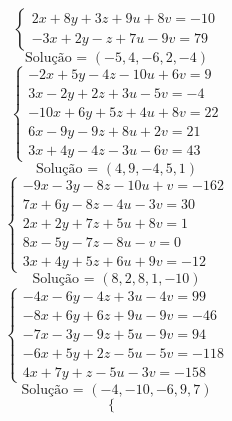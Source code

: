 \documentclass[12pt,oneside,a4paper,fleqn]{article}
\begin{document}
\begin{multicols*}{2}
\begin{equation*}
\begin{cases}
2x+8y+3z+9u+8v=-10 \\
-3x+2y-z+7u-9v=79
\end{cases}
\end{equation*}
\begin{equation*}
\text{Solução = }\left(-5,4,-6,2,-4\right)
\end{equation*}
\vspace{\baselineskip}
\begin{equation*}
\begin{cases}
-2x+5y-4z-10u+6v=9 \\
3x-2y+2z+3u-5v=-4 \\
-10x+6y+5z+4u+8v=22 \\
6x-9y-9z+8u+2v=21 \\
3x+4y-4z-3u-6v=43
\end{cases}
\end{equation*}
\begin{equation*}
\text{Solução = }\left(4,9,-4,5,1\right)
\end{equation*}
\vspace{\baselineskip}
\begin{equation*}
\begin{cases}
-9x-3y-8z-10u+v=-162 \\
7x+6y-8z-4u-3v=30 \\
2x+2y+7z+5u+8v=1 \\
8x-5y-7z-8u-v=0 \\
3x+4y+5z+6u+9v=-12
\end{cases}
\end{equation*}
\begin{equation*}
\text{Solução = }\left(8,2,8,1,-10\right)
\end{equation*}
\vspace{\baselineskip}
\begin{equation*}
\begin{cases}
-4x-6y-4z+3u-4v=99 \\
-8x+6y+6z+9u-9v=-46 \\
-7x-3y-9z+5u-9v=94 \\
-6x+5y+2z-5u-5v=-118 \\
4x+7y+z-5u-3v=-158
\end{cases}
\end{equation*}
\begin{equation*}
\text{Solução = }\left(-4,-10,-6,9,7\right)
\end{equation*}
\vspace{\baselineskip}
\begin{equation*}
\begin{cases}

\end{cases}
\end{equation*}
\end{multicols*}
\end{document}
